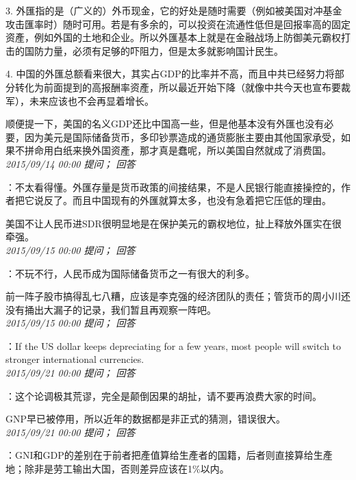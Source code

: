 \documentclass[twocolumn]{ctexart}
\begin{document}
3. 外匯指的是（广义的）外币现金，它的好处是随时需要（例如被美国对冲基金攻击匯率时）随时可用。若是有多余的，可以投资在流通性低但是回报率高的固定资產，例如外国的土地和企业。所以外匯基本上就是在金融战场上防御美元霸权打击的国防力量，必须有足够的吓阻力，但是太多就影响国计民生。

4. 中国的外匯总额看来很大，其实占GDP的比率并不高，而且中共已经努力将部分转化为前面提到的高报酬率资產，所以最近开始下降（就像中共今天也宣布要裁军），未来应该也不会再显着增长。

顺便提一下，美国的名义GDP还比中国高一些，但是他基本没有外匯也没有必要，因为美元是国际储备货币，多印钞票造成的通货膨胀主要由其他国家承受，如果不拼命用白纸来换外国资產，那才真是蠢呢，所以美国自然就成了消费国。\\

\textit{\hfill\noindent\small 2015/09/14 00:00 提问； 回答}

：不太看得懂。外匯存量是货币政策的间接结果，不是人民银行能直接操控的，作者把它说反了。而且中国现有的外匯就算太多，也没有急着把它压低的理由。

美国不让人民币进SDR很明显地是在保护美元的霸权地位，扯上释放外匯实在很牵强。\\

\textit{\hfill\noindent\small 2015/09/15 00:00 提问； 回答}

：不玩不行，人民币成为国际储备货币之一有很大的利多。

前一阵子股市搞得乱七八糟，应该是李克强的经济团队的责任；管货币的周小川还没有捅出大漏子的记录，我们暂且再观察一阵吧。\\

\textit{\hfill\noindent\small 2015/09/15 00:00 提问； 回答}

：If the US dollar keeps depreciating for a few years, most people will switch to stronger international currencies.\\

\textit{\hfill\noindent\small 2015/09/21 00:00 提问； 回答}

：这个论调极其荒谬，完全是颠倒因果的胡扯，请不要再浪费大家的时间。

GNP早已被停用，所以近年的数据都是非正式的猜测，错误很大。\\

\textit{\hfill\noindent\small 2015/09/21 00:00 提问； 回答}

：GNI和GDP的差别在于前者把產值算给生產者的国籍，后者则直接算给生產地；除非是劳工输出大国，否则差异应该在1\%以内。
\end{document}
